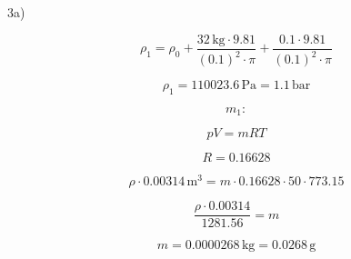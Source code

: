 3a) 

\[
\rho_1 = \rho_0 + \frac{32 \, \text{kg} \cdot 9.81}{(0.1)^2 \cdot \pi} + \frac{0.1 \cdot 9.81}{(0.1)^2 \cdot \pi}
\]

\[
\rho_1 = 110023.6 \, \text{Pa} = 1.1 \, \text{bar}
\]

\[
m_1:
\]

\[
pV = mRT
\]

\[
R = 0.16628
\]

\[
\rho \cdot 0.00314 \, \text{m}^3 = m \cdot 0.16628 \cdot 50 \cdot 773.15
\]

\[
\frac{\rho \cdot 0.00314}{1281.56} = m
\]

\[
m = 0.0000268 \, \text{kg} = 0.0268 \, \text{g}
\]